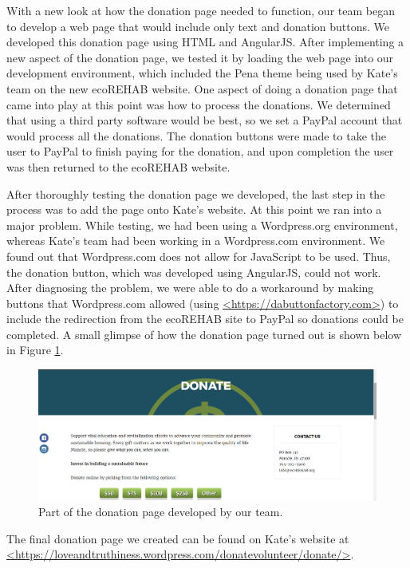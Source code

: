 \documentclass[letter]{article}
\begin{document}
With a new look at how the donation page needed to function, our team began to develop a web page that would include only text and donation buttons. We developed this donation page using HTML and AngularJS. After implementing a new aspect of the donation page, we tested it by loading the web page into our development environment, which included the Pena theme being used by Kate's team on the new ecoREHAB website. One aspect of doing a donation page that came into play at this point was how to process the donations. We determined that using a third party software would be best, so we set a PayPal account that would process all the donations. The donation buttons were made to take the user to PayPal to finish paying for the donation, and upon completion the user was then returned to the ecoREHAB website. 

After thoroughly testing the donation page we developed, the last step in the process was to add the page onto Kate's website. At this point we ran into a major problem. While testing, we had been using a Wordpress.org environment, whereas Kate's team had been working in a Wordpress.com environment. We found out that Wordpress.com does not allow for JavaScript to be used. Thus, the donation button, which was developed using AngularJS, could not work. After diagnosing the problem, we were able to do a workaround by making buttons that Wordpress.com allowed (using \url{<https://dabuttonfactory.com>}) to include the redirection from the ecoREHAB site to PayPal so donations could be completed. A small glimpse of how the donation page turned out is shown below in Figure \ref{fig:4}.
\begin{figure}[H]
	\includegraphics[scale=0.5]{Donation}
	\captionsetup{justification=centering}
	\centering
	\caption{Part of the donation page developed by our team.}
	\label{fig:4}
\end{figure}
The final donation page we created can be found on Kate's website at \url{<https://loveandtruthiness.wordpress.com/donatevolunteer/donate/>}.
\end{document}
